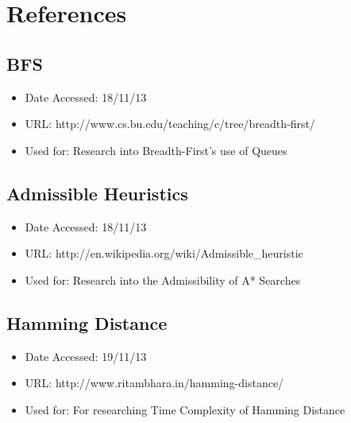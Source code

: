 \documentclass[11pt]{article} %
\begin{document}
		\section{References}

			\subsection{BFS}
			\begin{itemize}
			\item Date Accessed: 18/11/13
			\item URL: http://www.cs.bu.edu/teaching/c/tree/breadth-first/
			\item Used for: Research into Breadth-First's use of Queues
			\end{itemize}

			\subsection{Admissible Heuristics}
			\begin{itemize}
			\item Date Accessed: 18/11/13
			\item URL: http://en.wikipedia.org/wiki/Admissible\_heuristic
			\item Used for: Research into the Admissibility of A* Searches
			\end{itemize}


			\subsection{Hamming Distance}
			\begin{itemize}
			\item Date Accessed: 19/11/13
			\item URL: http://www.ritambhara.in/hamming-distance/
			\item Used for: For researching Time Complexity of Hamming Distance
			\end{itemize}
	
	
\end{document}
